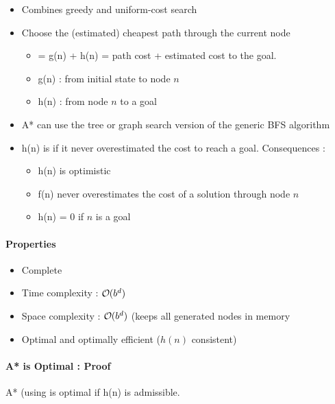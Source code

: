 \begin{itemize}
\item Combines greedy and uniform-cost search
\item Choose the (estimated) cheapest path through the current node
	\begin{itemize}
	\item {} = g(n) + h(n) = path cost + estimated cost to the goal.
	\item g(n) :  from initial state to node $n$
	\item h(n) :  from node $n$ to a goal
	\end{itemize}
\item A* can use the tree or graph search version of the generic BFS algorithm
\item h(n) is  if it never overestimated the cost to reach a goal. Consequences :
	\begin{itemize}
	\item h(n) is optimistic
	\item f(n) never overestimates the cost of a solution through node $n$
	\item h(n) = 0 if $n$ is a goal
	\end{itemize}
\end{itemize}

\paragraph{Properties}
\begin{itemize}
\item Complete
\item Time complexity : $\bigO (b^d)$
\item Space complexity : $\bigO (b^d)$ (keeps all generated nodes in memory
\item Optimal and optimally efficient ($h(n)$ consistent)
\end{itemize}

\paragraph{A* is Optimal : Proof}

A* (using  is optimal if h(n) is admissible.

